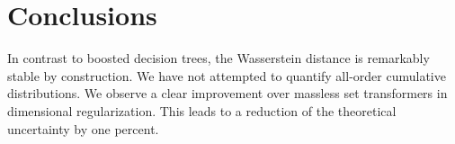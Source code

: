 \section{Conclusions}\label{sec:conclusions}

In contrast to boosted decision trees, the Wasserstein distance is
remarkably stable by construction. We have not attempted to quantify
all-order cumulative distributions. We observe a clear improvement over
massless set transformers in dimensional regularization. This leads to a
reduction of the theoretical uncertainty by one percent.

